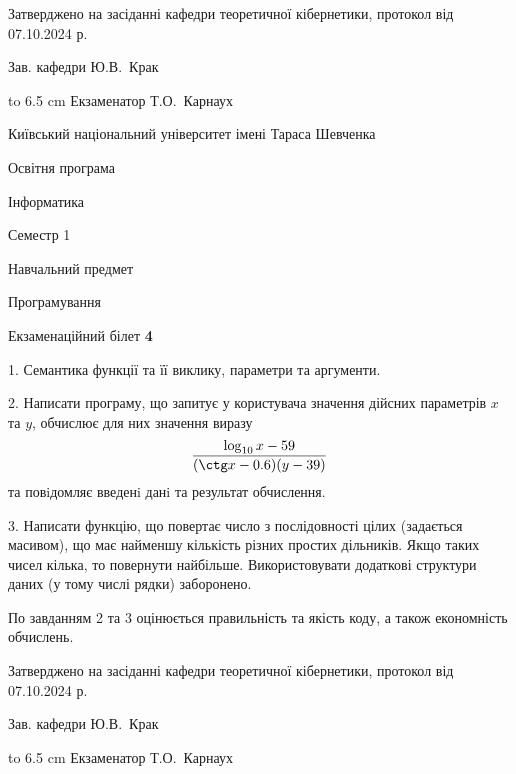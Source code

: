 \documentclass[12pt, ukrainian]{article}
\begin{document}
{\smallskip\smallskip \begin {scriptsize} Затверджено на засіданні кафедри теоретичної кібернетики, протокол   від   07.10.2024 р.\par\smallskip\smallskip\smallskip\smallskip
{\parbox {6.5 cm} {Зав. кафедри \dotfill Ю.В.~Крак}}\hspace {0.7cm} {\hbox to 6.5 cm { Екзаменатор \dotfill Т.О.~Карнаух}} \end{scriptsize}}
\newpage
{{\begin {scriptsize}\par
{ \center  Київський національний університет імені Тараса Шевченка \par}
{\parbox {5 cm}{Освітня програма \hfill}{\parbox {7 cm}{Інформатика\hfill}}\parbox {6 cm}{\hfill Семестр 1}}\par
{\parbox {5 cm} {Навчальний предмет \hfill}\parbox {7 cm}{Програмування \hfill}\parbox {6cm}{\hfill}\par}\vspace{-15pt} \end{scriptsize}}{\center Екзаменаційний білет \No \textbf { 4 }\par}}
{%
1. Семантика функції та її виклику, параметри та аргументи.%
\par
2. Написати програму, що запитує у користувача значення дійсних параметрів $x$ та $y$, обчислює для них значення виразу 
$$\frac{\log_{10} x - 59}{(\ctg x - 0.6) (y - 39)}$$ 
та повiдомляє введенi данi та результат обчислення.

\par
3. Написати функцію, що повертає число з послідовності цілих (задається масивом), що має найменшу кількість різних простих дільників. Якщо таких чисел кілька, то повернути найбільше. Використовувати додаткові структури даних (у тому числі рядки) заборонено.

По завданням 2 та 3 оцінюється правильність та якість коду, а також економність обчислень.

}
{\smallskip\smallskip \begin {scriptsize} Затверджено на засіданні кафедри теоретичної кібернетики, протокол   від   07.10.2024 р.\par\smallskip\smallskip\smallskip\smallskip
{\parbox {6.5 cm} {Зав. кафедри \dotfill Ю.В.~Крак}}\hspace {0.7cm} {\hbox to 6.5 cm { Екзаменатор \dotfill Т.О.~Карнаух}} \end{scriptsize}}
\vspace{0.9cm}
\end{document}
